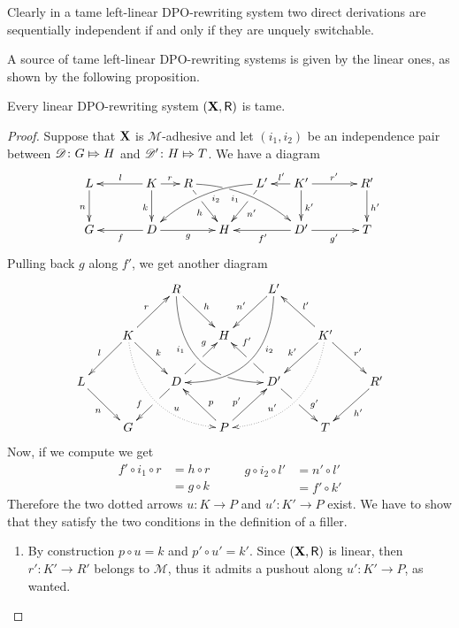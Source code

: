 \begin{remark}
  Clearly in a tame left-linear DPO-rewriting system two direct derivations are sequentially independent if and only if they are unquely switchable.
\end{remark}

A source of tame left-linear DPO-rewriting systems is given by the linear ones, as shown by the following proposition.

\begin{proposition}\label{prop:equi}Every linear DPO-rewriting system $(\textbf {\textup{X}}, \mathsf{R})$ is tame.
 \end{proposition}
\begin{proof} Suppose that $\textbf {\textup{X}}$ is $\mathcal{M}$-adhesive and let $(i_1, i_2)$ be an independence pair between $\mathscr{D}\colon G\Mapsto H$ and $\mathscr{D}'\colon H\Mapsto T$. We have a diagram
	\[\xymatrix@C=15pt{L \ar[d]_{n}&& K \ar[d]_{k}\ar[ll]_{l} \ar[r]^{r} & R \ar@/^.35cm/[drrr]|(.3)\hole_(.4){i_1} \ar[dr]|(.3)\hole_{h} && L' \ar@/_.35cm/[dlll]^(.4){i_2} \ar[dl]|(.3)\hole^{n'}& K' \ar[d]^{k'}\ar[l]_{l'} \ar[rr]^{r'} && R' \ar[d]^{h'}\\G && \ar[ll]^{f} D \ar[rr]_{g}&& H  && \ar[ll]^{f'} D' \ar[rr]_{g'}&& T}\]
Pulling back $g$ along $f'$, we get another diagram 
	\[\xymatrix{&&R \ar@/_1cm/[ddrr]_(.35){i_1}|(.7)\hole \ar[dr]^{h}&& L'\ar@/^1cm/[ddll]^(.35){i_2}  \ar[dl]_{n'}\\&K\ar[dr]^{k}\ar[dl]_{l} \ar@{.>}@/_.8cm/[ddrr]^(.65){u}\ar[ur]^{r}&& H && K' \ar@{.>}@/^.8cm/[ddll]_(.65){u'}\ar[dl]_{k'}\ar[lu]_{l'} \ar[dr]^{r'}\\L \ar[dr]_{n} && D \ar[dl]|(.42)\hole_(.64){f}\ar[ur]|(.48)\hole^(.7){g}&&D' \ar[dr]|(.42)\hole^(.65){g'} \ar[ul]|(.48)\hole_(.7){f'}&&R'\ar[dl]^{h'}\\&G &&P\ar[ur]^(.4){p'}\ar[ul]_(.4){p}&&T}\] 
Now, if we compute we get
\[\begin{split}
	f'\circ i_1\circ r &= h\circ r \\&= g\circ k
\end{split}\qquad \begin{split}
g\circ i_2\circ l' &= n'\circ l'\\&=f'\circ k'
\end{split}\]
Therefore the two dotted arrows $u\colon K\to P$ and $u'\colon K'\to P$ exist. We have to show that they satisfy the two conditions in the definition of a filler. 
\begin{enumerate}
	\item  By construction $p\circ u = k$ and $p'\circ u'=k'$. Since $(\textbf {\textup{X}}, \mathsf{R})$ is linear, then $r'\colon K'\to R'$ belongs to $\mathcal{M}$, thus it admits a pushout along $u'\colon K'\to P$, as wanted.

\end{enumerate}
\end{proof}
